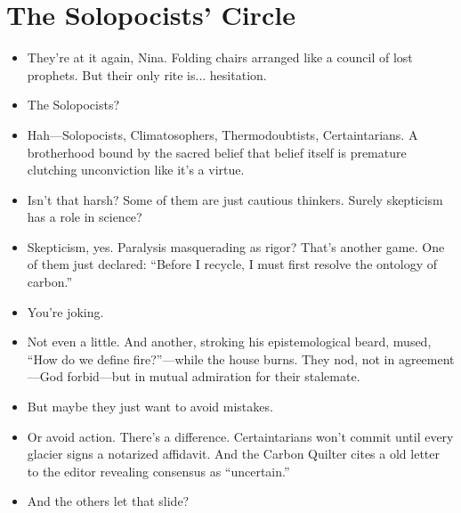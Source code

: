 \chapter{The Solopocists' Circle}

\begin{itemize}[leftmargin=1.3cm]

\item[Eleanor:] They’re at it again, Nina. Folding chairs arranged like a council of lost prophets. But their only rite is... hesitation.

\item[Nina:] The Solopocists?

\item[Eleanor:] Hah—Solopocists, Climatosophers, Thermodoubtists, Certaintarians. A brotherhood bound by the sacred belief that belief itself is premature clutching unconviction like it’s a virtue.

\item[Nina:] Isn’t that harsh? Some of them are just cautious thinkers. Surely skepticism has a role in science?

\item[Eleanor:] Skepticism, yes. Paralysis masquerading as rigor? That’s another game. One of them just declared: “Before I recycle, I must first resolve the ontology of carbon.”

\item[Nina:] You’re joking.

\item[Eleanor:] Not even a little. And another, stroking his epistemological beard, mused, “How do we define fire?”—while the house burns. They nod, not in agreement—God forbid—but in mutual admiration for their stalemate.

\item[Nina:] But maybe they just want to avoid mistakes.

\item[Eleanor:] Or avoid action. There’s a difference. Certaintarians won’t commit until every glacier signs a notarized affidavit. And the Carbon Quilter cites a old letter to the editor revealing consensus as “uncertain.”

\item[Nina:] And the others let that slide?


\end{itemize}
